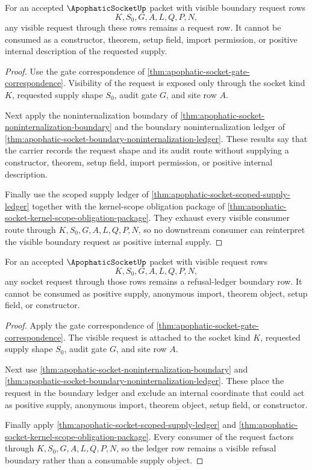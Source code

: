 \begin{theorem}
\label{thm:apophatic-socket-positive-supply-refusal-scope}
For an accepted $\ApophaticSocketUp$ packet with visible boundary request rows
$$
K,S_0,G,A,L,Q,P,N,
$$
any visible request through these rows remains a request row. It cannot be consumed as a constructor, theorem, setup field, import permission, or positive internal description of the requested supply.
\end{theorem}
\begin{proof}
Use the gate correspondence of \autoref{thm:apophatic-socket-gate-correspondence}. Visibility of the request is exposed only through the socket kind $K$, requested supply shape $S_0$, audit gate $G$, and site row $A$.

Next apply the noninternalization boundary of \autoref{thm:apophatic-socket-noninternalization-boundary} and the boundary noninternalization ledger of \autoref{thm:apophatic-socket-boundary-noninternalization-ledger}. These results say that the carrier records the request shape and its audit route without supplying a constructor, theorem, setup field, import permission, or positive internal description.

Finally use the scoped supply ledger of \autoref{thm:apophatic-socket-scoped-supply-ledger} together with the kernel-scope obligation package of \autoref{thm:apophatic-socket-kernel-scope-obligation-package}. They exhaust every visible consumer route through $K,S_0,G,A,L,Q,P,N$, so no downstream consumer can reinterpret the visible boundary request as positive internal supply.
\end{proof}

\begin{theorem}
\label{thm:apophatic-socket-refusal-ledger-boundary}
For an accepted $\ApophaticSocketUp$ packet with visible request rows
$$
K,S_0,G,A,L,Q,P,N,
$$
any socket request through those rows remains a refusal-ledger boundary row. It
cannot be consumed as positive supply, anonymous import, theorem object, setup
field, or constructor.
\end{theorem}
\begin{proof}
Apply the gate correspondence of
\autoref{thm:apophatic-socket-gate-correspondence}. The visible request is
attached to the socket kind $K$, requested supply shape $S_0$, audit gate $G$,
and site row $A$.

Next use \autoref{thm:apophatic-socket-noninternalization-boundary} and
\autoref{thm:apophatic-socket-boundary-noninternalization-ledger}. These place
the request in the boundary ledger and exclude an internal coordinate that
could act as positive supply, anonymous import, theorem object, setup field, or
constructor.

Finally apply \autoref{thm:apophatic-socket-scoped-supply-ledger} and
\autoref{thm:apophatic-socket-kernel-scope-obligation-package}. Every consumer
of the request factors through $K,S_0,G,A,L,Q,P,N$, so the ledger row remains a
visible refusal boundary rather than a consumable supply object.
\end{proof}

